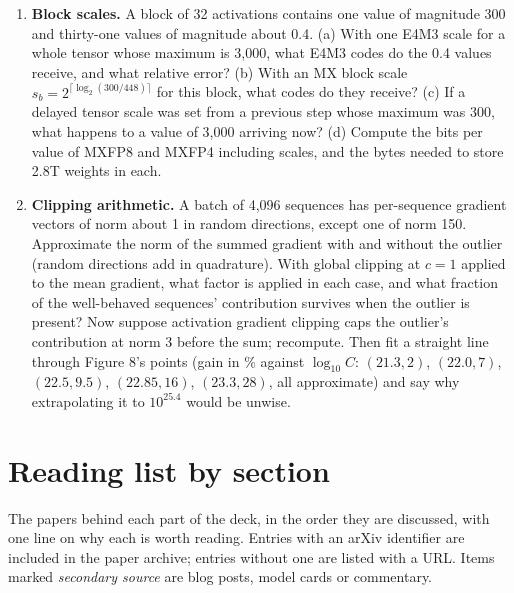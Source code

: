 \documentclass[11pt,letterpaper]{article}
\begin{document}
\begin{enumerate}[leftmargin=1.6em,itemsep=6pt]
\item \textbf{Block scales.} A block of 32 activations contains one value of magnitude 300 and thirty-one values of magnitude about 0.4. (a) With one E4M3 scale for a whole tensor whose maximum is 3,000, what E4M3 codes do the 0.4 values receive, and what relative error? (b) With an MX block scale $s_b=2^{\lceil\log_2(300/448)\rceil}$ for this block, what codes do they receive? (c) If a delayed tensor scale was set from a previous step whose maximum was 300, what happens to a value of 3,000 arriving now? (d) Compute the bits per value of MXFP8 and MXFP4 including scales, and the bytes needed to store 2.8T weights in each.
\item \textbf{Clipping arithmetic.} A batch of 4,096 sequences has per-sequence gradient vectors of norm about 1 in random directions, except one of norm 150. Approximate the norm of the summed gradient with and without the outlier (random directions add in quadrature). With global clipping at $c=1$ applied to the mean gradient, what factor is applied in each case, and what fraction of the well-behaved sequences' contribution survives when the outlier is present? Now suppose activation gradient clipping caps the outlier's contribution at norm 3 before the sum; recompute. Then fit a straight line through Figure 8's points (gain in \% against $\log_{10}C$: $(21.3,2)$, $(22.0,7)$, $(22.5,9.5)$, $(22.85,16)$, $(23.3,28)$, all approximate) and say why extrapolating it to $10^{25.4}$ would be unwise.
\end{enumerate}
\clearpage
\section{Reading list by section}\label{app:reading}
The papers behind each part of the deck, in the order they are discussed, with one line on why each is worth reading. Entries with an arXiv identifier are included in the paper archive; entries without one are listed with a URL. Items marked \emph{secondary source} are blog posts, model cards or commentary.
\end{document}
